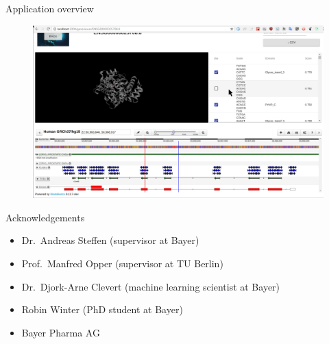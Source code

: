 \documentclass[Nike]{tuberlinbeamer}
\begin{document}
\begin{frame}[fragile]{Application overview}
  \begin{figure}
    \centering
    \includegraphics[width=0.8\linewidth]{screen4.png}
  \end{figure}
\end{frame}

\begin{frame}{Acknowledgements}
  \begin{itemize}
    \item Dr.\ Andreas Steffen (supervisor at Bayer)
    \item Prof.\ Manfred Opper (supervisor at TU Berlin)
    \item Dr.\ Djork-Arne Clevert (machine learning scientist at Bayer)
    \item Robin Winter (PhD student at Bayer)
    \item Bayer Pharma AG
  \end{itemize}

\end{frame}
\end{document}
